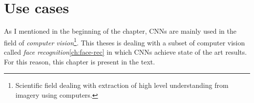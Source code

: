 \section{Use cases}\label{sec:use-cases}
As I mentioned in the beginning of the chapter, CNNs are mainly used in the field of
\textit{computer vision}\footnote{Scientific field dealing with extraction of high level understanding from imagery
using computers.}.
This theses is dealing with a subset of computer vision called \textit{face recognition}\ref{ch:face-rec} in which CNNs
achieve state of the art results.
For this reason, this chapter is present in the text.